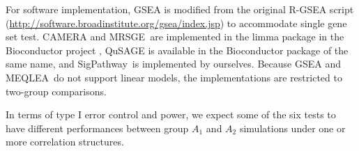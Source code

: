 \documentclass[useAMS,usenatbib, galley]{biom}
\newcommand{\OurMethod}{MEQLEA}
\newcommand{\HowmanyTest}{six}
\newcommand{\CMR}{CAMERA-rank}
\newcommand{\CMT}{CAMERA-modt}
\newcommand{\gent}{SigPathway}
\newcommand{\genr}{MRSGE}
\begin{document}
		
		For software implementation, GSEA is modified from the original R-GSEA script (\url{http://software.broadinstitute.org/gsea/index.jsp}) to accommodate single gene set test. CAMERA and \genr~are implemented in the limma package \citep{smyth2005limma} in the Bioconductor project \citep{gentleman2004bioconductor}, QuSAGE is available in the Bioconductor package of the same name, and \gent~is implemented by ourselves. Because GSEA and \OurMethod~do not support linear models, the implementations are restricted to two-group comparisons.
		
		
		
		In terms of type I error control and power, we expect some of the six tests to have different performances between group $A_1$ and $A_2$ simulations under one or more correlation structures. 
		 
\end{document}
